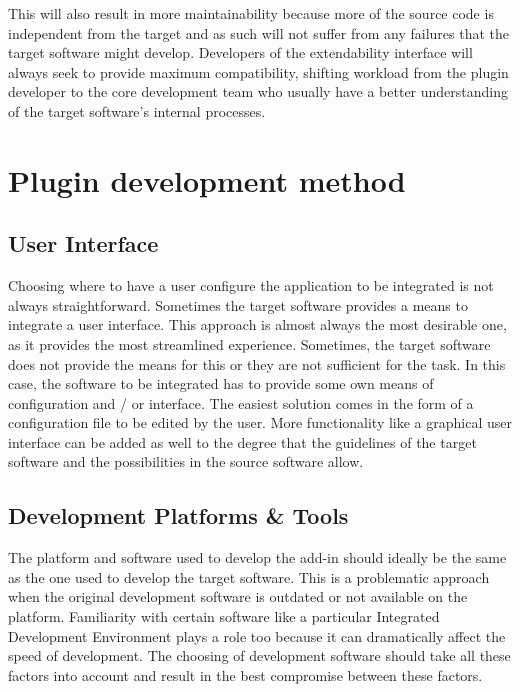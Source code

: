 \documentclass[BSA,Bachelor,english]{twbook}%
\begin{document}
This will also result in more maintainability because more of the source code is independent from the target and as such will not suffer from any failures that the target software might develop. Developers of the extendability interface will always seek to provide maximum compatibility, shifting workload from the plugin developer to the core development team who usually have a better understanding of the target software's internal processes.

\newpage

\chapter{Plugin development method}


\section{User Interface}

Choosing where to have a user configure the application to be integrated is not always straightforward. Sometimes the target software provides a means to integrate a user interface. This approach is almost always the most desirable one, as it provides the most streamlined experience. Sometimes, the target software does not provide the means for this or they are not sufficient for the task. In this case, the software to be integrated has to provide some own means of configuration and / or interface. The easiest solution comes in the form of a configuration file to be edited by the user. More functionality like a graphical user interface can be added as well to the degree that the guidelines of the target software and the possibilities in the source software allow.

\section{Development Platforms \& Tools}

The platform and software used to develop the add-in should ideally be the same as the one used to develop the target software. This is a problematic approach when the original development software is outdated or not available on the platform. Familiarity with certain software like a particular Integrated Development Environment plays a role too because it can dramatically affect the speed of development. The choosing of development software should take all these factors into account and result in the best compromise between these factors.
\newpage
\end{document}
